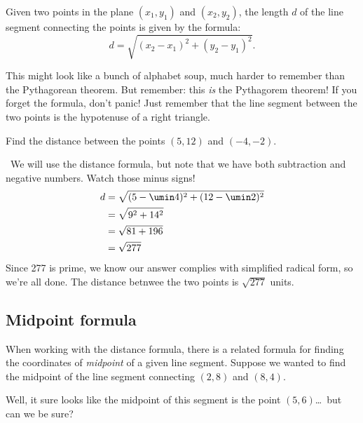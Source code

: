 \begin{boxeddef}
Given two points in the plane $(x_1, y_1)$ and $(x_2, y_2)$, the length $d$ of the line segment connecting the points is given by the formula:
\[d = \sqrt{ (x_2 - x_1)^2 + (y_2 - y_1)^2 }.\]
\end{boxeddef}

This might look like a bunch of alphabet soup, much harder to remember than the Pythagorean theorem. But remember: this \textit{is} the Pythagorem theorem! If you forget the formula, don't panic! Just remember that the line segment between the two points is the hypotenuse of a right triangle.

\begin{boxedex}
Find the distance between the points $(5, 12)$ and $(-4, -2)$.

\exsoln\ We will use the distance formula, but note that we have both subtraction and negative numbers. Watch those minus signs!
\[\begin{aligned}
d &= \sqrt{ (5 - \umin4)^2 + (12 - \umin2)^2 } \\
&= \sqrt{ 9^2 + 14^2 } \\
&=\sqrt{ 81 + 196 } \\
&=\sqrt{ 277 }
\end{aligned}\]
Since 277 is prime, we know our answer complies with simplified radical form, so we're all done. The distance betnwee the two points is $\sqrt{277}$ units.
\end{boxedex}

\subsection{Midpoint formula}

When working with the distance formula, there is a related formula for finding the coordinates of \textit{midpoint} of a given line segment. Suppose we wanted to find the midpoint of the line segment connecting $(2,8)$ and $(8,4)$.
\begin{center}
\end{center}
Well, it sure looks like the midpoint of this segment is the point $(5,6)$\ldots\ but can we be sure?

